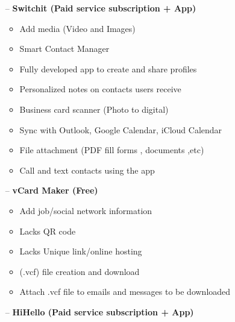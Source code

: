 \documentclass[12pt]{article}%
\begin{document}
\begin{enumerate}
\begin{enumerate}
\begin{enumerate}
                \item [--] \textbf{Switchit (Paid service subscription + App)}

                \begin{itemize}
                    \item Add media (Video and Images)
                    \item Smart Contact Manager
                    \item Fully developed app to create and share profiles
                    \item Personalized notes on contacts users receive
                    \item Business card scanner (Photo to digital)
                    \item Sync with Outlook, Google Calendar, iCloud Calendar
                    \item File attachment (PDF fill forms , documents ,etc)
                    \item Call and text contacts using the app
                \end{itemize}

                \item [--] \textbf{vCard Maker (Free)}
                \begin{itemize}
                    \item Add job/social network information
                    \item Lacks QR code
                    \item Lacks Unique link/online hosting
                    \item (.vcf) file creation and download
                    \item Attach .vcf file to emails and messages to be downloaded
                \end{itemize}

                \item [--] \textbf{HiHello (Paid service subscription + App)}


\end{enumerate}
\end{enumerate}
\end{enumerate}
\end{document}
